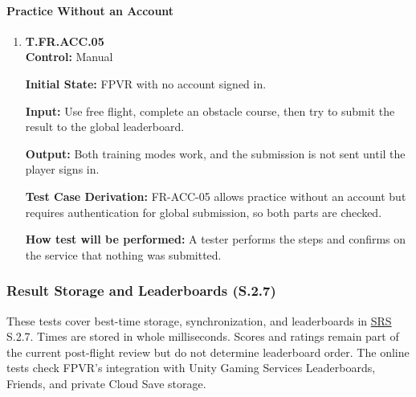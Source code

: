 \documentclass[12pt, titlepage]{article}
\begin{document}
{\begin{enumerate}
\end{enumerate}

\paragraph{Practice Without an Account}

\begin{enumerate}

\item{\hypertarget{test-fr-acc-05}{}\textbf{T.FR.ACC.05}\\}
\textbf{Control:} Manual

\textbf{Initial State:} FPVR with no account signed in.

\textbf{Input:} Use free flight, complete an obstacle course, then try to submit the
result to the global leaderboard.

\textbf{Output:} Both training modes work, and the submission is not sent until the
player signs in.

\textbf{Test Case Derivation:} \mbox{FR-ACC-05} allows practice without an account but
requires authentication for global submission, so both parts are checked.

\textbf{How test will be performed:} A tester performs the steps and confirms on the
service that nothing was submitted.

\end{enumerate}
\par}

\subsubsection{Result Storage and Leaderboards (S.2.7)}

These tests cover best-time storage, synchronization, and leaderboards in \hyperlink{abbr:SRS}{SRS} S.2.7. Times are stored in whole milliseconds. Scores and ratings remain part of the current post-flight review but do not determine leaderboard order. The online tests check FPVR's integration with Unity Gaming Services Leaderboards, Friends, and private Cloud Save storage.
\end{document}
